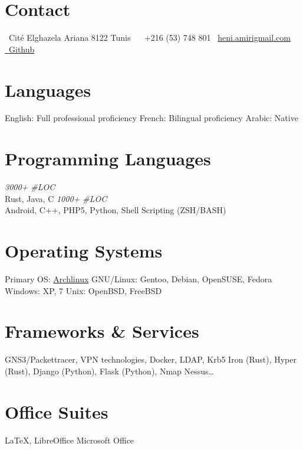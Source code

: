\documentclass[]{friggeri-cv}
\begin{document}


\begin{aside} %
\section{Contact}
\Mundus~Cité Elghazela
Ariana 8122
Tunis
~
\Telefon~+216 (53) 748 801
\Letter~\href{mailto:heni.amiri@gmail.com}{heni.amiri\MVAt gmail.com}
\href{http://github.com/TheHitchhiker}{\faGitSquare~Github}
\section{Languages}
English: Full professional proficiency
French: Bilingual proficiency
Arabic: Native
\section{Programming Languages}
\emph{3000+ \#LOC}\\Rust, Java, C
\emph{1000+ \#LOC}\\Android, C++, PHP5, Python, Shell Scripting (ZSH/BASH)
\section{Operating Systems}
Primary OS: \href {http://www.archlinux.org}{Archlinux}
GNU/Linux: Gentoo, Debian, OpenSUSE, Fedora
Windows: XP, 7
Unix: OpenBSD, FreeBSD
\section{Frameworks \& Services}
GNS3/Packettracer,
VPN technologies, Docker, LDAP, Krb5
Iron (Rust), Hyper (Rust), Django (Python), Flask (Python), Nmap
Nessus\ldots
\section{Office Suites}
\LaTeX, LibreOffice
Microsoft Office
\end{aside}

\end{document}
